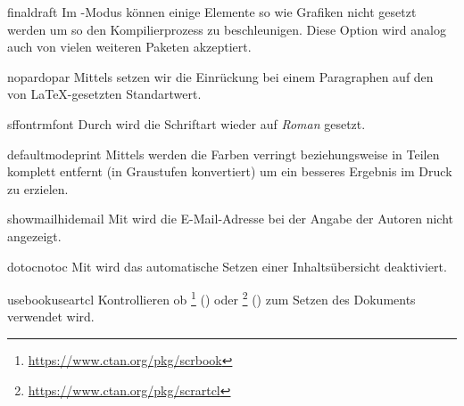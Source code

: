 \documentclass[useartcl,notoc]{sopra-paper}
\begin{document}
    \begin{argument}{final}{draft}
        Im -Modus können einige Elemente so wie Grafiken nicht
        gesetzt werden um so den Kompilierprozess zu beschleunigen.
        Diese Option wird analog auch von vielen weiteren Paketen akzeptiert.
    \end{argument}

    \begin{argument}{nopar}{dopar}
        Mittels  setzen wir die Einrückung bei einem Paragraphen
        auf den von \LaTeX-gesetzten Standartwert.
    \end{argument}


    \begin{argument}{sffont}{rmfont}
        Durch  wird die Schriftart wieder auf \emph{Roman} gesetzt.
    \end{argument}

    \begin{argument}{defaultmode}{print}
        Mittels  werden die Farben verringt beziehungsweise in Teilen
        komplett entfernt (in Graustufen konvertiert) um ein besseres Ergebnis
        im Druck zu erzielen.
    \end{argument}

    \begin{argument}{showmail}{hidemail}
        Mit  wird die E-Mail-Adresse bei der Angabe der Autoren
        nicht angezeigt.
    \end{argument}

    \begin{argument}{dotoc}{notoc}
        Mit  wird das automatische Setzen einer Inhaltsübersicht deaktiviert.
    \end{argument}

    \begin{argument}{usebook}{useartcl}
        Kontrollieren ob \footnote{\url{https://www.ctan.org/pkg/scrbook}} () oder \footnote{\url{https://www.ctan.org/pkg/scrartcl}} () zum Setzen des Dokuments verwendet wird. 
    \end{argument}
\end{document}
